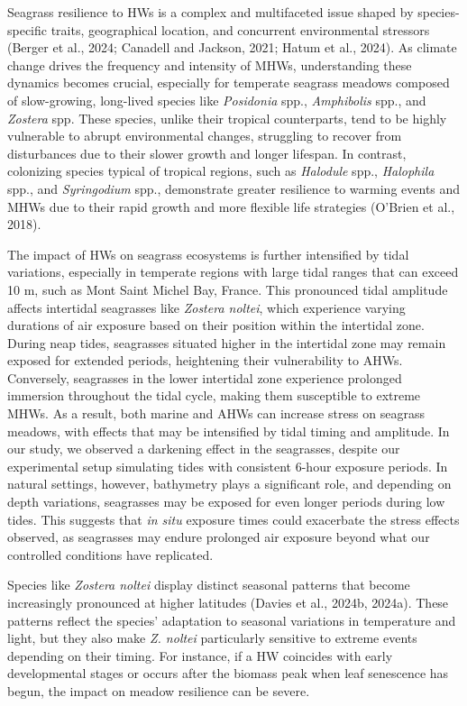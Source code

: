 \documentclass[
  letterpaper,
  11pt,
  english,
  singlespacing,
  headsepline]{MastersDoctoralThesis}
\begin{document}
\begin{spacing}{1.5}
Seagrass resilience to HWs is a complex and multifaceted issue shaped by
species-specific traits, geographical location, and concurrent
environmental stressors (Berger et al., 2024; Canadell and Jackson,
2021; Hatum et al., 2024). As climate change drives the frequency and
intensity of MHWs, understanding these dynamics becomes crucial,
especially for temperate seagrass meadows composed of slow-growing,
long-lived species like \emph{Posidonia} spp., \emph{Amphibolis} spp.,
and \emph{Zostera} spp. These species, unlike their tropical
counterparts, tend to be highly vulnerable to abrupt environmental
changes, struggling to recover from disturbances due to their slower
growth and longer lifespan. In contrast, colonizing species typical of
tropical regions, such as \emph{Halodule} spp., \emph{Halophila} spp.,
and \emph{Syringodium} spp., demonstrate greater resilience to warming
events and MHWs due to their rapid growth and more flexible life
strategies (O'Brien et al., 2018).

The impact of HWs on seagrass ecosystems is further intensified by tidal
variations, especially in temperate regions with large tidal ranges that
can exceed 10 m, such as Mont Saint Michel Bay, France. This pronounced
tidal amplitude affects intertidal seagrasses like \emph{Zostera
noltei}, which experience varying durations of air exposure based on
their position within the intertidal zone. During neap tides, seagrasses
situated higher in the intertidal zone may remain exposed for extended
periods, heightening their vulnerability to AHWs. Conversely, seagrasses
in the lower intertidal zone experience prolonged immersion throughout
the tidal cycle, making them susceptible to extreme MHWs. As a result,
both marine and AHWs can increase stress on seagrass meadows, with
effects that may be intensified by tidal timing and amplitude. In our
study, we observed a darkening effect in the seagrasses, despite our
experimental setup simulating tides with consistent 6-hour exposure
periods. In natural settings, however, bathymetry plays a significant
role, and depending on depth variations, seagrasses may be exposed for
even longer periods during low tides. This suggests that \emph{in situ}
exposure times could exacerbate the stress effects observed, as
seagrasses may endure prolonged air exposure beyond what our controlled
conditions have replicated.

Species like \emph{Zostera noltei} display distinct seasonal patterns
that become increasingly pronounced at higher latitudes (Davies et al.,
2024b, 2024a). These patterns reflect the species' adaptation to
seasonal variations in temperature and light, but they also make
\emph{Z. noltei} particularly sensitive to extreme events depending on
their timing. For instance, if a HW coincides with early developmental
stages or occurs after the biomass peak when leaf senescence has begun,
the impact on meadow resilience can be severe.


\end{spacing}
\end{document}
